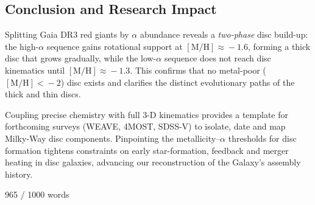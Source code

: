 \documentclass[a4paper,10pt]{article}
\begin{document}
\begin{multicols}{2}
\section*{Conclusion and Research Impact}

Splitting Gaia DR3 red giants by $\alpha$ abundance reveals a \emph{two-phase} disc build-up:  
the high-$\alpha$ sequence gains rotational support at $\mathrm{[M/H]}\!\approx\!-1.6$, forming 
a thick disc that grows gradually, while the low-$\alpha$ sequence does not reach disc 
kinematics until $\mathrm{[M/H]}\!\approx\!-1.3$. This confirms that no metal-poor 
($\mathrm{[M/H]}\!<\!-2$) disc exists and clarifies the distinct evolutionary paths of 
the thick and thin discs.  

Coupling precise chemistry with full 3-D kinematics provides a template for forthcoming surveys 
(WEAVE, 4MOST, SDSS-V) to isolate, date and map Milky-Way disc components. Pinpointing the 
metallicity–$\alpha$ thresholds for disc formation tightens constraints on early star-formation, 
feedback and merger heating in disc galaxies, advancing our reconstruction of the Galaxy’s 
assembly history.  


\newpage{}

965 / 1000 words








  


\end{multicols}
\end{document}

